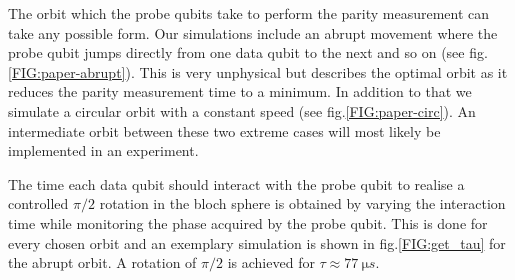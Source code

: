 The orbit which the probe qubits take to perform the parity measurement can take any possible form. Our simulations include an abrupt movement where the probe qubit jumps directly from one data qubit to the next and so on (see fig.\@ \ref{FIG:paper-abrupt}). This is very unphysical but describes the optimal orbit as it reduces the parity measurement time to a minimum. In addition to that we simulate a circular orbit with a constant speed (see fig.\@ \ref{FIG:paper-circ}). An intermediate orbit between these two extreme cases will most likely be implemented in an experiment. 

The time each data qubit should interact with the probe qubit to realise a controlled $\pi/2$ rotation in the bloch sphere is obtained by varying the interaction time while monitoring the phase acquired by the probe qubit. This is done for every chosen orbit and an exemplary simulation is shown in fig.\@ \ref{FIG:get_tau} for the abrupt orbit. A rotation of $\pi/2$ is achieved for $\tau\approx \SI{77}{\micro s}$.

